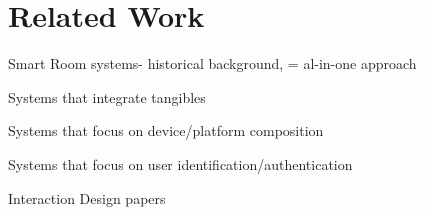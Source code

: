 \chapter{Related Work}

Smart Room systems- historical background, 
= al-in-one approach

Systems that integrate tangibles

Systems that focus on device/platform composition

Systems that focus on user identification/authentication

Interaction Design papers

